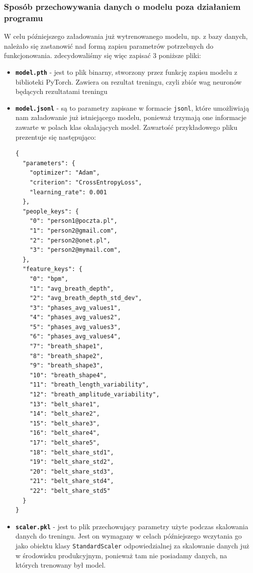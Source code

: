     \subsubsection{Sposób przechowywania danych o modelu poza działaniem programu}
    W celu późniejszego załadowania już wytrenowanego modelu, np. z bazy danych, należało
    się zastanowić nad formą zapisu parametrów potrzebnych do funkcjonowania. zdecydowaliśmy się
    więc zapisać 3 poniższe pliki:
    \begin{itemize}
        \item \textbf{\texttt{model.pth}} - jest to plik binarny, stworzony przez funkcję zapisu modelu
        z biblioteki PyTorch. Zawiera on rezultat treningu, czyli zbiór wag neuronów będących
        rezultatami treningu
        \item \textbf{\texttt{model.jsonl}} - są to parametry zapisane w formacie \texttt{jsonl}, które
        umożliwiają nam załadowanie już istniejącego modelu, ponieważ trzymają one informacje
        zawarte w polach klas okalających model. Zawartość przykładowego pliku
        prezentuje się następująco:\\
        \begin{center}
            \begin{verbatim}
{
  "parameters": {
    "optimizer": "Adam",
    "criterion": "CrossEntropyLoss",
    "learning_rate": 0.001
  },
  "people_keys": {
    "0": "person1@poczta.pl",
    "1": "person2@gmail.com",
    "2": "person2@onet.pl",
    "3": "person2@mymail.com",
  }, 
  "feature_keys": {
    "0": "bpm",
    "1": "avg_breath_depth",
    "2": "avg_breath_depth_std_dev",
    "3": "phases_avg_values1",
    "4": "phases_avg_values2",
    "5": "phases_avg_values3",
    "6": "phases_avg_values4",
    "7": "breath_shape1",
    "8": "breath_shape2",
    "9": "breath_shape3",
    "10": "breath_shape4",
    "11": "breath_length_variability",
    "12": "breath_amplitude_variability",
    "13": "belt_share1",
    "14": "belt_share2",
    "15": "belt_share3",
    "16": "belt_share4",
    "17": "belt_share5",
    "18": "belt_share_std1",
    "19": "belt_share_std2",
    "20": "belt_share_std3",
    "21": "belt_share_std4",
    "22": "belt_share_std5"
  }
}
            \end{verbatim}
        \end{center}
        \item \textbf{\texttt{scaler.pkl}} - jest to plik przechowujący parametry użyte podczas
        skalowania danych do treningu. Jest on wymagany w celach późniejszego wczytania go jako
        obiektu klasy \texttt{StandardScaler} odpowiedzialnej za skalowanie danych już w środowisku produkcyjnym,
        ponieważ tam nie posiadamy danych, na których trenowany był model.
    \end{itemize}
